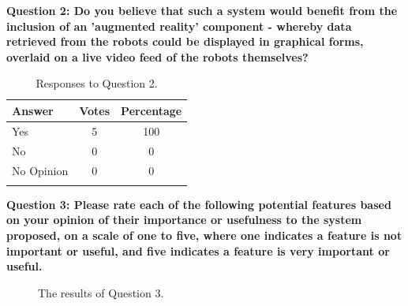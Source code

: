 \clearpage
\noindent\textbf{Question 2: Do you believe that such a system would benefit from the inclusion of an 'augmented reality' component - whereby data retrieved from the robots could be displayed in graphical forms, overlaid on a live video feed of the robots themselves?}

\begin{longtable}{ l c c }
 \textbf{Answer} & \textbf{Votes} & \textbf{Percentage} \\ 
 \hline
 Yes & 5 & 100 \\ 
 No & 0 & 0 \\
 No Opinion & 0 & 0 \\
 \bottomrule
 \caption{Responses to Question 2.}
 \label{tab:QuestionTwoData}
\end{longtable}

\noindent\textbf{Question 3: Please rate each of the following potential features based on your opinion of their importance or usefulness to the system proposed, on a scale of one to five, where one indicates a feature is not important or useful, and five indicates a feature is very important or useful.}

\begin{figure}[h]
	\centering
	\decoRule
	\caption[Initial Survey Question 3 Results]{The results of Question 3.}
	\label{fig:FeatureLikert}
\end{figure}


